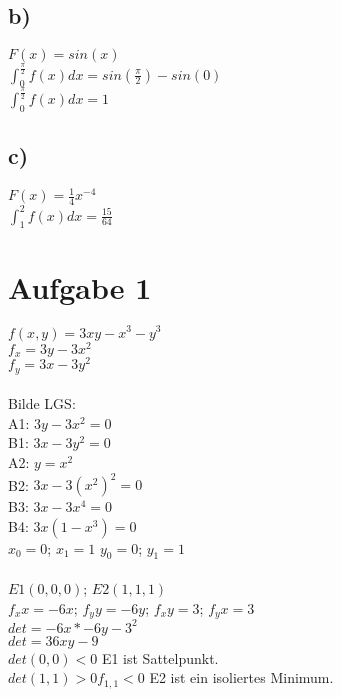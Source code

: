 \documentclass{article}
\begin{document}
	\subsection*{b)}
	$F(x) = sin(x)$ \\
	$\int_{0}^{\frac{\pi}{2}}f(x)dx = sin(\frac{\pi}{2}) - sin(0)$ \\
	$\int_{0}^{\frac{\pi}{2}}f(x)dx = 1$
	\subsection*{c)}
	$F(x) = \frac{1}{4}x^{-4}$ \\
	$\int_{1}^{2}f(x)dx = \frac{15}{64}$
	\section*{Aufgabe 1}
	$f(x,y) = 3xy- x^3 - y^3$ \\
	$f_x = 3y - 3x^2$ \\
	$f_y = 3x - 3y^2$ \\ \\
	Bilde LGS: \\
	A1: $3y - 3x^2 = 0$ \\
	B1: $3x - 3y^2 = 0$ \\
	A2: $y = x^2$ \\
	B2: $3x - 3(x^2)^2 = 0$ \\
	B3: $3x - 3x^4 = 0$ \\
	B4: $3x(1-x^3) = 0$ \\
	$x_0 = 0$; $x_1 = 1$ $y_0 = 0$; $y_1 = 1$ \\ \\
	$E1(0,0,0)$;  $E2(1,1,1)$ \\
	$f_xx = -6x$; $f_yy = -6y$; $f_xy = 3$; $f_yx = 3$ \\
	$det = -6x * -6y - 3^2$ \\
	$det = 36xy - 9$ \\
	$det(0,0) < 0$ E1 ist Sattelpunkt. \\
	$det(1,1) > 0 f_{1,1} < 0$ E2 ist ein isoliertes Minimum.
\end{document}
